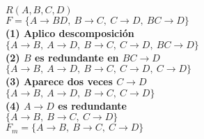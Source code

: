 \documentclass[preview]{standalone}
\begin{document}
$R(A,B,C,D)$\\
$F=\big\{A\rightarrow BD,\ B\rightarrow C,\ C\rightarrow D,\ BC\rightarrow D\big\}$\\

\textbf{(1) Aplico descomposici\'on}\\
$\big\{A\rightarrow B,\ A\rightarrow D,\ B\rightarrow C,\ C\rightarrow D,\ BC\rightarrow D\big\}$\\

\textbf{(2) $B$ es redundante en $BC\rightarrow D$}\\
$\big\{A\rightarrow B,\ A\rightarrow D,\ B\rightarrow C,\ C\rightarrow D,\ C\rightarrow D\big\}$\\

\textbf{(3) Aparece dos veces $C\rightarrow D$}\\
$\big\{A\rightarrow B,\ A\rightarrow D,\ B\rightarrow C,\ C\rightarrow D\big\}$\\

\textbf{(4) $A\rightarrow D$ es redundante}\\
$\big\{A\rightarrow B,\ B\rightarrow C,\ C\rightarrow D\big\}$\\

$F_m=\big\{A\rightarrow B,\ B\rightarrow C,\ C\rightarrow D\big\}$
\end{document}
